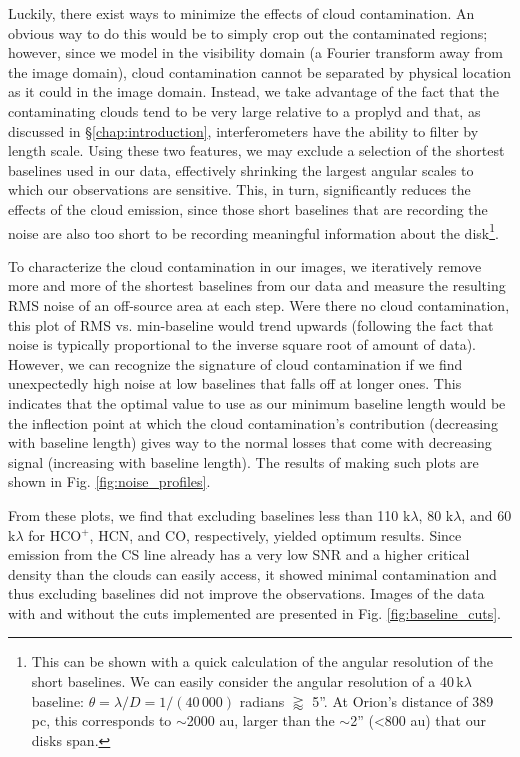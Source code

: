 Luckily, there exist ways to minimize the effects of cloud contamination. An obvious way to do this would be to simply crop out the contaminated regions; however, since we model in the visibility domain (a Fourier transform away from the image domain), cloud contamination cannot be separated by physical location as it could in the image domain. Instead, we take advantage of the fact that the contaminating clouds tend to be very large relative to a proplyd and that, as discussed in \S\ref{chap:introduction}, interferometers have the ability to filter by length scale. Using these two features, we may exclude a selection of the shortest baselines used in our data, effectively shrinking the largest angular scales to which our observations are sensitive. This, in turn, significantly reduces the effects of the cloud emission, since those short baselines that are recording the noise are also too short to be recording meaningful information about the disk\footnote{This can be shown with a quick calculation of the angular resolution of the short baselines. We can easily consider the angular resolution of a 40\,k$\lambda$ baseline: $\theta = \lambda/D = 1/(40\,000)$ radians $\gtrapprox$ 5''. At Orion's distance of 389 pc, this corresponds to $\sim$2000 au, larger than the $\sim$2'' (\textless800 au) that our disks span.}.


To characterize the cloud contamination in our images, we iteratively remove more and more of the shortest baselines from our data and measure the resulting RMS noise of an off-source area at each step. Were there no cloud contamination, this plot of RMS vs. min-baseline would trend upwards (following the fact that noise is typically proportional to the inverse square root of amount of data). However, we can recognize the signature of cloud contamination if we find unexpectedly high noise at low baselines that falls off at longer ones. This indicates that the optimal value to use as our minimum baseline length would be the inflection point at which the cloud contamination's contribution (decreasing with baseline length) gives way to the normal losses that come with decreasing signal (increasing with baseline length). The results of making such plots are shown in Fig. \ref{fig:noise_profiles}.

From these plots, we find that excluding baselines less than 110 k$\lambda$, 80 k$\lambda$, and 60  k$\lambda$ for HCO$^{+}$, HCN, and CO, respectively, yielded optimum results. Since emission from the CS line already has a very low SNR and a higher critical density than the clouds can easily access, it showed minimal contamination and thus excluding baselines did not improve the observations. Images of the data with and without the cuts implemented are presented in Fig. \ref{fig:baseline_cuts}.

